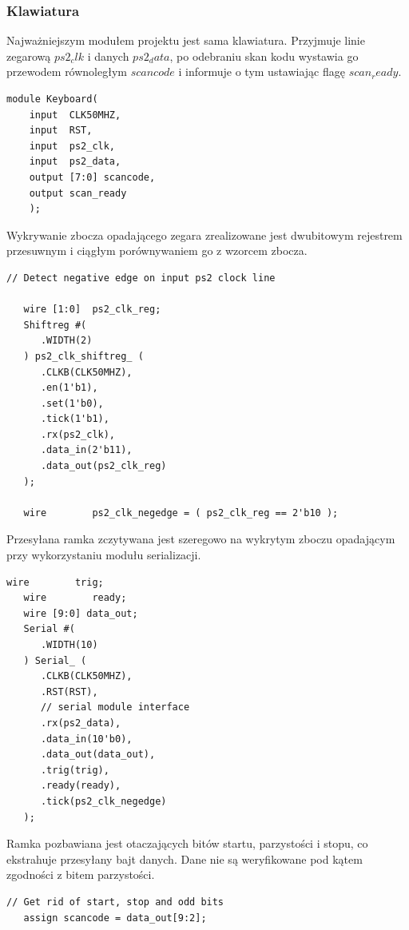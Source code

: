 \documentclass[a4paper,12pt]{article}
\begin{document}
\subsubsection{Klawiatura}
Najważniejszym modułem projektu jest sama klawiatura. Przyjmuje linie zegarową $ps2_clk$ i danych $ps2_data$, po odebraniu skan kodu wystawia go przewodem równoległym $scancode$ i informuje o tym ustawiając flagę $scan_ready$.
\begin{lstlisting}[label=Keyboard,caption=Keyboard.v]
module Keyboard(
    input  CLK50MHZ,
    input  RST,
    input  ps2_clk,
    input  ps2_data,
    output [7:0] scancode,
    output scan_ready
    );
\end{lstlisting}

Wykrywanie zbocza opadającego zegara zrealizowane jest dwubitowym rejestrem przesuwnym i ciągłym porównywaniem go z wzorcem zbocza.
\begin{lstlisting}[label=Keyboard,caption=Keyboard.v,firstnumber=10]
   // Detect negative edge on input ps2 clock line

   wire [1:0]  ps2_clk_reg;
   Shiftreg #(
      .WIDTH(2)
   ) ps2_clk_shiftreg_ (
      .CLKB(CLK50MHZ),
      .en(1'b1),
      .set(1'b0),
      .tick(1'b1),
      .rx(ps2_clk),
      .data_in(2'b11),
      .data_out(ps2_clk_reg)
   );

   wire        ps2_clk_negedge = ( ps2_clk_reg == 2'b10 );
\end{lstlisting}

Przesyłana ramka zczytywana jest szeregowo na wykrytym zboczu opadającym przy wykorzystaniu modułu serializacji.
\begin{lstlisting}[label=Keyboard,caption=Keyboard.v,firstnumber=26]
   wire        trig;
   wire        ready;
   wire [9:0] data_out;
   Serial #(
      .WIDTH(10)
   ) Serial_ (
      .CLKB(CLK50MHZ),
      .RST(RST),
      // serial module interface
      .rx(ps2_data),
      .data_in(10'b0),
      .data_out(data_out),
      .trig(trig),
      .ready(ready),
      .tick(ps2_clk_negedge)
   );
\end{lstlisting}

Ramka pozbawiana jest otaczających bitów startu, parzystości i stopu, co ekstrahuje przesyłany bajt danych. Dane nie są weryfikowane pod kątem zgodności z bitem parzystości.
\begin{lstlisting}[label=Keyboard,caption=Keyboard.v,firstnumber=43]
   // Get rid of start, stop and odd bits
   assign scancode = data_out[9:2];
\end{lstlisting}
\end{document}
